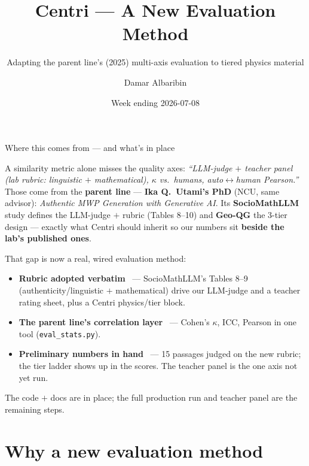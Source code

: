 \documentclass[aspectratio=169,10pt]{beamer}
\title{Centri --- A New Evaluation Method}
\subtitle{Adapting the parent line's (2025) multi-axis evaluation to tiered physics material}
\author{Damar Albaribin}
\institute{MSc Thesis --- advisor: Prof.\ Wu-Yuin Hwang}
\date{Week ending 2026-07-08}
\newcommand{\ok}{{\color{cApp}\textbf{\checkmark}}}
\begin{document}
\maketitle

\begin{frame}{Where this comes from --- and what's in place}
\small
\begin{tcolorbox}[colback=cGrey!8,colframe=cGrey,title=\footnotesize The gap this fills,boxsep=2pt,left=4pt,right=4pt]
\scriptsize
A similarity metric alone misses the quality axes: \emph{``LLM-judge $+$ teacher panel
(lab rubric: linguistic $+$ mathematical), $\kappa$ vs.\ humans, auto$\leftrightarrow$human Pearson.''}
Those come from the \textbf{parent line} --- \textbf{Ika Q.\ Utami's PhD} (NCU, same advisor):
\emph{Authentic MWP Generation with Generative AI}. Its \textbf{SocioMathLLM} study defines the
LLM-judge $+$ rubric (Tables 8--10) and \textbf{Geo-QG} the 3-tier design --- exactly what Centri
should inherit so our numbers sit \textbf{beside the lab's published ones}.
\end{tcolorbox}
\vspace{0.2em}
That gap is now a real, wired evaluation method:
\begin{itemize}\setlength\itemsep{1pt}
  \item \textbf{\color{cMeas}Rubric adopted verbatim} \ok\ --- SocioMathLLM's Tables 8--9 (authenticity/linguistic
  $+$ mathematical) drive our LLM-judge and a teacher rating sheet, plus a Centri physics/tier block.
  \item \textbf{\color{cPed}The parent line's correlation layer} \ok\ --- Cohen's $\kappa$, ICC, Pearson
  in one tool (\texttt{eval\_stats.py}).
  \item \textbf{\color{cApp}Preliminary numbers in hand} \ok\ --- 15 passages judged on the new rubric;
  the tier ladder shows up in the scores. The teacher panel is the one axis not yet run.
\end{itemize}
{\footnotesize The code $+$ docs are in place; the full production run and teacher panel are the remaining steps.}
\end{frame}

\section{Why a new evaluation method}
\end{document}
